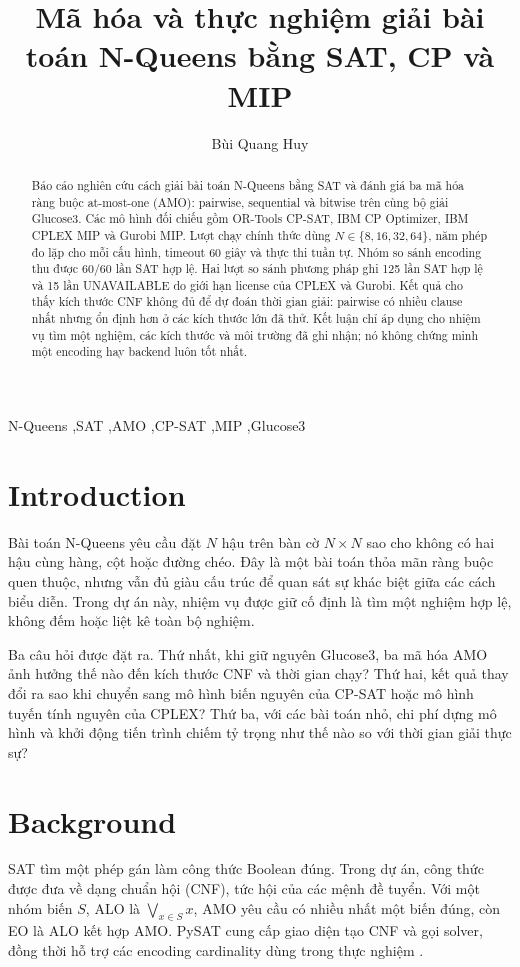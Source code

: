\documentclass[a4paper,fleqn]{cas-sc}
\begin{document}
\title{Mã hóa và thực nghiệm giải bài toán N-Queens bằng SAT, CP và MIP}
\author[1]{Bùi Quang Huy}
\begin{abstract}
Báo cáo nghiên cứu cách giải bài toán N-Queens bằng SAT và đánh giá ba mã hóa ràng buộc at-most-one (AMO): pairwise, sequential và bitwise trên cùng bộ giải Glucose3. Các mô hình đối chiếu gồm OR-Tools CP-SAT, IBM CP Optimizer, IBM CPLEX MIP và Gurobi MIP. Lượt chạy chính thức dùng $N\in\{8,16,32,64\}$, năm phép đo lặp cho mỗi cấu hình, timeout 60 giây và thực thi tuần tự. Nhóm so sánh encoding thu được 60/60 lần SAT hợp lệ. Hai lượt so sánh phương pháp ghi 125 lần SAT hợp lệ và 15 lần UNAVAILABLE do giới hạn license của CPLEX và Gurobi. Kết quả cho thấy kích thước CNF không đủ để dự đoán thời gian giải: pairwise có nhiều clause nhất nhưng ổn định hơn ở các kích thước lớn đã thử. Kết luận chỉ áp dụng cho nhiệm vụ tìm một nghiệm, các kích thước và môi trường đã ghi nhận; nó không chứng minh một encoding hay backend luôn tốt nhất.
\end{abstract}
\begin{keywords}N-Queens \sep SAT \sep AMO \sep CP-SAT \sep MIP \sep Glucose3\end{keywords}
\maketitle

\section{Introduction}
Bài toán N-Queens yêu cầu đặt $N$ hậu trên bàn cờ $N\times N$ sao cho không có hai hậu cùng hàng, cột hoặc đường chéo. Đây là một bài toán thỏa mãn ràng buộc quen thuộc, nhưng vẫn đủ giàu cấu trúc để quan sát sự khác biệt giữa các cách biểu diễn. Trong dự án này, nhiệm vụ được giữ cố định là tìm một nghiệm hợp lệ, không đếm hoặc liệt kê toàn bộ nghiệm.

Ba câu hỏi được đặt ra. Thứ nhất, khi giữ nguyên Glucose3, ba mã hóa AMO ảnh hưởng thế nào đến kích thước CNF và thời gian chạy? Thứ hai, kết quả thay đổi ra sao khi chuyển sang mô hình biến nguyên của CP-SAT hoặc mô hình tuyến tính nguyên của CPLEX? Thứ ba, với các bài toán nhỏ, chi phí dựng mô hình và khởi động tiến trình chiếm tỷ trọng như thế nào so với thời gian giải thực sự?

\section{Background}
SAT tìm một phép gán làm công thức Boolean đúng. Trong dự án, công thức được đưa về dạng chuẩn hội (CNF), tức hội của các mệnh đề tuyển. Với một nhóm biến $S$, ALO là $\bigvee_{x\in S}x$, AMO yêu cầu có nhiều nhất một biến đúng, còn EO là ALO kết hợp AMO. PySAT cung cấp giao diện tạo CNF và gọi solver, đồng thời hỗ trợ các encoding cardinality dùng trong thực nghiệm \cite{pysat,sinz}.
\end{document}
